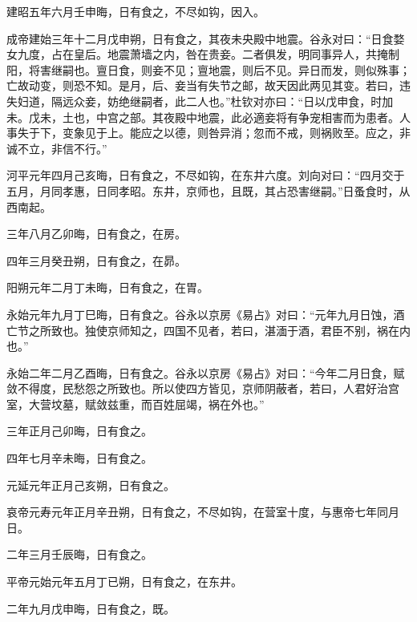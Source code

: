 \documentclass[12pt,UTF8]{ctexbook}
\begin{document}
建昭五年六月壬申晦，日有食之，不尽如钩，因入。



成帝建始三年十二月戊申朔，日有食之，其夜未央殿中地震。谷永对曰：“日食婺女九度，占在皇后。地震萧墙之内，咎在贵妾。二者俱发，明同事异人，共掩制阳，将害继嗣也。亶日食，则妾不见；亶地震，则后不见。异日而发，则似殊事；亡故动变，则恐不知。是月，后、妾当有失节之邮，故天因此两见其变。若曰，违失妇道，隔远众妾，妨绝继嗣者，此二人也。”杜钦对亦曰：“日以戊申食，时加未。戊未，土也，中宫之部。其夜殿中地震，此必適妾将有争宠相害而为患者。人事失于下，变象见于上。能应之以德，则咎异消；忽而不戒，则祸败至。应之，非诚不立，非信不行。”



河平元年四月己亥晦，日有食之，不尽如钩，在东井六度。刘向对曰：“四月交于五月，月同孝惠，日同孝昭。东井，京师也，且既，其占恐害继嗣。”日蚤食时，从西南起。



三年八月乙卯晦，日有食之，在房。



四年三月癸丑朔，日有食之，在昴。



阳朔元年二月丁未晦，日有食之，在胃。



永始元年九月丁巳晦，日有食之。谷永以京房《易占》对曰：“元年九月日蚀，酒亡节之所致也。独使京师知之，四国不见者，若曰，湛湎于酒，君臣不别，祸在内也。”



永始二年二月乙酉晦，日有食之。谷永以京房《易占》对曰：“今年二月日食，赋敛不得度，民愁怨之所致也。所以使四方皆见，京师阴蔽者，若曰，人君好治宫室，大营坟墓，赋敛兹重，而百姓屈竭，祸在外也。”



三年正月己卯晦，日有食之。



四年七月辛未晦，日有食之。



元延元年正月己亥朔，日有食之。



哀帝元寿元年正月辛丑朔，日有食之，不尽如钩，在营室十度，与惠帝七年同月日。



二年三月壬辰晦，日有食之。



平帝元始元年五月丁已朔，日有食之，在东井。



二年九月戊申晦，日有食之，既。
\end{document}
